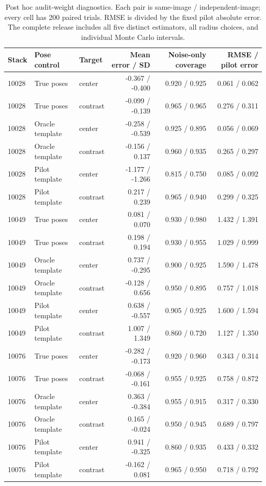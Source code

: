 \begin{table}[t]
\centering\footnotesize
\caption{Post hoc audit-weight diagnostics. Each pair is same-image / independent-image; every cell has 200 paired trials. RMSE is divided by the fixed pilot absolute error. The complete release includes all five distinct estimators, all radius choices, and individual Monte Carlo intervals.}
\label{tab:refittingbias}
\begin{tabular}{lllrrr}\toprule
Stack & Pose control & Target & Mean error / SD & Noise-only coverage & RMSE / pilot error \\\midrule
10028 & True poses & center & -0.367 / -0.400 & 0.920 / 0.925 & 0.061 / 0.062 \\
10028 & True poses & contrast & -0.099 / -0.139 & 0.965 / 0.965 & 0.276 / 0.311 \\
10028 & Oracle template & center & -0.258 / -0.539 & 0.925 / 0.895 & 0.056 / 0.069 \\
10028 & Oracle template & contrast & -0.156 / 0.137 & 0.960 / 0.935 & 0.265 / 0.297 \\
10028 & Pilot template & center & -1.177 / -1.266 & 0.815 / 0.750 & 0.085 / 0.092 \\
10028 & Pilot template & contrast & 0.217 / 0.239 & 0.965 / 0.940 & 0.299 / 0.325 \\
10049 & True poses & center & 0.081 / 0.070 & 0.930 / 0.980 & 1.432 / 1.391 \\
10049 & True poses & contrast & 0.198 / 0.194 & 0.930 / 0.955 & 1.029 / 0.999 \\
10049 & Oracle template & center & 0.737 / -0.295 & 0.900 / 0.925 & 1.590 / 1.478 \\
10049 & Oracle template & contrast & -0.128 / 0.656 & 0.950 / 0.895 & 0.757 / 1.018 \\
10049 & Pilot template & center & 0.638 / -0.557 & 0.905 / 0.925 & 1.600 / 1.594 \\
10049 & Pilot template & contrast & 1.007 / 1.349 & 0.860 / 0.720 & 1.127 / 1.350 \\
10076 & True poses & center & -0.282 / -0.173 & 0.920 / 0.960 & 0.343 / 0.314 \\
10076 & True poses & contrast & -0.068 / -0.161 & 0.955 / 0.925 & 0.758 / 0.872 \\
10076 & Oracle template & center & 0.363 / -0.384 & 0.955 / 0.915 & 0.317 / 0.330 \\
10076 & Oracle template & contrast & 0.165 / -0.024 & 0.950 / 0.945 & 0.689 / 0.797 \\
10076 & Pilot template & center & 0.941 / -0.325 & 0.860 / 0.935 & 0.433 / 0.332 \\
10076 & Pilot template & contrast & -0.162 / 0.081 & 0.965 / 0.950 & 0.718 / 0.792 \\
\bottomrule\end{tabular}
\end{table}
